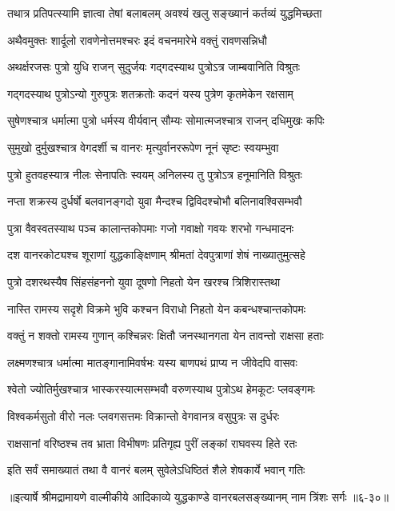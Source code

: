 \twolineshloka
{तथात्र प्रतिपत्स्यामि ज्ञात्वा तेषां बलाबलम्}
{अवश्यं खलु सङ्ख्यानं कर्तव्यं युद्धमिच्छता} %

\twolineshloka
{अथैवमुक्तः शार्दूलो रावणेनोत्तमश्चरः}
{इदं वचनमारेभे वक्तुं रावणसन्निधौ} %

\twolineshloka
{अथर्क्षरजसः पुत्रो युधि राजन् सुदुर्जयः}
{गद्गदस्याथ पुत्रोऽत्र जाम्बवानिति विश्रुतः} %

\twolineshloka
{गद्गदस्याथ पुत्रोऽन्यो गुरुपुत्रः शतक्रतोः}
{कदनं यस्य पुत्रेण कृतमेकेन रक्षसाम्} %

\twolineshloka
{सुषेणश्चात्र धर्मात्मा पुत्रो धर्मस्य वीर्यवान्}
{सौम्यः सोमात्मजश्चात्र राजन् दधिमुखः कपिः} %

\twolineshloka
{सुमुखो दुर्मुखश्चात्र वेगदर्शी च वानरः}
{मृत्युर्वानररूपेण नूनं सृष्टः स्वयम्भुवा} %

\twolineshloka
{पुत्रो हुतवहस्यात्र नीलः सेनापतिः स्वयम्}
{अनिलस्य तु पुत्रोऽत्र हनूमानिति विश्रुतः} %

\twolineshloka
{नप्ता शक्रस्य दुर्धर्षो बलवानङ्गदो युवा}
{मैन्दश्च द्विविदश्चोभौ बलिनावश्विसम्भवौ} %

\twolineshloka
{पुत्रा वैवस्वतस्याथ पञ्च कालान्तकोपमाः}
{गजो गवाक्षो गवयः शरभो गन्धमादनः} %

\twolineshloka
{दश वानरकोट्यश्च शूराणां युद्धकाङ्क्षिणाम्}
{श्रीमतां देवपुत्राणां शेषं नाख्यातुमुत्सहे} %

\twolineshloka
{पुत्रो दशरथस्यैष सिंहसंहननो युवा}
{दूषणो निहतो येन खरश्च त्रिशिरास्तथा} %

\twolineshloka
{नास्ति रामस्य सदृशे विक्रमे भुवि कश्चन}
{विराधो निहतो येन कबन्धश्चान्तकोपमः} %

\twolineshloka
{वक्तुं न शक्तो रामस्य गुणान् कश्चिन्नरः क्षितौ}
{जनस्थानगता येन तावन्तो राक्षसा हताः} %

\twolineshloka
{लक्ष्मणश्चात्र धर्मात्मा मातङ्गानामिवर्षभः}
{यस्य बाणपथं प्राप्य न जीवेदपि वासवः} %

\twolineshloka
{श्वेतो ज्योतिर्मुखश्चात्र भास्करस्यात्मसम्भवौ}
{वरुणस्याथ पुत्रोऽथ हेमकूटः प्लवङ्गमः} %

\twolineshloka
{विश्वकर्मसुतो वीरो नलः प्लवगसत्तमः}
{विक्रान्तो वेगवानत्र वसुपुत्रः स दुर्धरः} %

\twolineshloka
{राक्षसानां वरिष्ठश्च तव भ्राता विभीषणः}
{प्रतिगृह्य पुरीं लङ्कां राघवस्य हिते रतः} %

\twolineshloka
{इति सर्वं समाख्यातं तथा वै वानरं बलम्}
{सुवेलेऽधिष्ठितं शैले शेषकार्ये भवान् गतिः} %


॥इत्यार्षे श्रीमद्रामायणे वाल्मीकीये आदिकाव्ये युद्धकाण्डे वानरबलसङ्ख्यानम् नाम त्रिंशः सर्गः ॥६-३०॥

